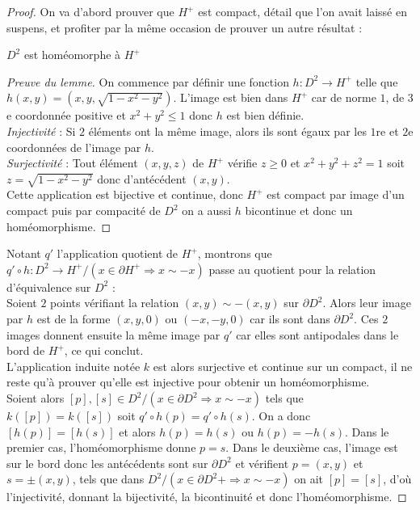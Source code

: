 \begin{proof}
    On va d'abord prouver que $H^+$ est compact, détail que l'on avait laissé en suspens, et profiter par la même occasion de prouver un autre résultat :
    \begin{lemme}
        $D^2$ est homéomorphe à $H^+$
    \end{lemme}
    \begin{proof}[Preuve du lemme]
        On commence par définir une fonction $h:D^2\rightarrow H^+$ telle que\\$h(x,y)=(x,y,\sqrt{1-x^2-y^2})$. L'image est bien dans $H^+$ car de norme $1$, de $3$e coordonnée positive et $x^2+y^2\leq1$ donc $h$ est bien définie.\medskip\\
        \textit{Injectivité} : Si $2$ éléments ont la même image, alors ils sont égaux par les $1$re et $2$e coordonnées de l'image par $h$.\medskip\\
        \textit{Surjectivité} : Tout élément $(x,y,z)$ de $H^+$ vérifie $z\geq0$ et $x^2+y^2+z^2=1$ soit $z=\sqrt{1-x^2-y^2}$ donc d'antécédent $(x,y)$.\medskip\\
        Cette application est bijective et continue, donc $H^+$ est compact par image d'un compact puis par compacité de $D^2$ on a aussi $h$ bicontinue et donc un homéomorphisme.
    \end{proof}
    Notant $q'$ l'application quotient de $H^+$, montrons que $q'\circ h:D^2\rightarrow H^+/(x\in\partial H^+\Rightarrow x\sim-x)$ passe au quotient pour la relation d'équivalence sur $D^2$ :\\Soient $2$ points vérifiant la relation $(x,y)\sim-(x,y)$ sur $\partial D^2$. Alors leur image par $h$ est de la forme $(x,y,0)$ ou $(-x,-y,0)$ car ils sont dans $\partial D^2$. Ces $2$ images donnent ensuite la même image par $q'$ car elles sont antipodales dans le bord de $H^+$, ce qui conclut.\medskip\\
    L'application induite notée $k$ est alors surjective et continue sur un compact, il ne reste qu'à prouver qu'elle est injective pour obtenir un homéomorphisme.\\Soient alors $[p],[s]\in D^2/(x\in\partial D^2\Rightarrow x\sim-x)$ tels que $k([p])=k([s])$ soit $q'\circ h(p)=q'\circ h(s)$. On a donc $[h(p)]=[h(s)]$ et alors $h(p)=h(s)$ ou $h(p)=-h(s)$. Dans le premier cas, l'homéomorphisme donne $p=s$. Dans le deuxième cas, l'image est sur le bord donc les antécédents sont sur $\partial D^2$ et vérifient $p=(x,y)$ et $s=\pm(x,y)$, tels que dans $D^2/(x\in\partial D^2+\Rightarrow x\sim-x)$ on ait $[p]=[s]$, d'où l'injectivité, donnant la bijectivité, la bicontinuité et donc l'homéomorphisme.
    \end{proof}
